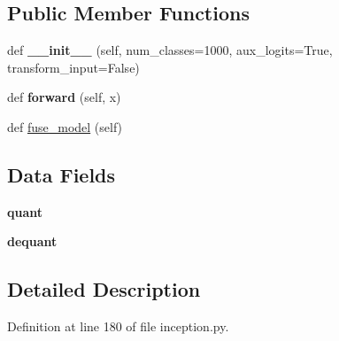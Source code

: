 \subsection*{Public Member Functions}
\begin{DoxyCompactItemize}
\item 
\mbox{\label{classtorchvision_1_1models_1_1quantization_1_1inception_1_1QuantizableInception3_a3021a40685c13187cc90aa89d45f06b9}} 
def {\bfseries \+\_\+\+\_\+init\+\_\+\+\_\+} (self, num\+\_\+classes=1000, aux\+\_\+logits=True, transform\+\_\+input=False)
\item 
\mbox{\label{classtorchvision_1_1models_1_1quantization_1_1inception_1_1QuantizableInception3_a7537fb6d277d0ace6c5495236dfca4f0}} 
def {\bfseries forward} (self, x)
\item 
def \hyperlink{classtorchvision_1_1models_1_1quantization_1_1inception_1_1QuantizableInception3_a37cfea450fb791cb71c7dacffd84851f}{fuse\+\_\+model} (self)
\end{DoxyCompactItemize}
\subsection*{Data Fields}
\begin{DoxyCompactItemize}
\item 
\mbox{\label{classtorchvision_1_1models_1_1quantization_1_1inception_1_1QuantizableInception3_aad6b852e35a224bd335dcc0a79e1cfa2}} 
{\bfseries quant}
\item 
\mbox{\label{classtorchvision_1_1models_1_1quantization_1_1inception_1_1QuantizableInception3_a26d9f198a6b5f8e056e5f80742de77ea}} 
{\bfseries dequant}
\end{DoxyCompactItemize}


\subsection{Detailed Description}


Definition at line 180 of file inception.\+py.



